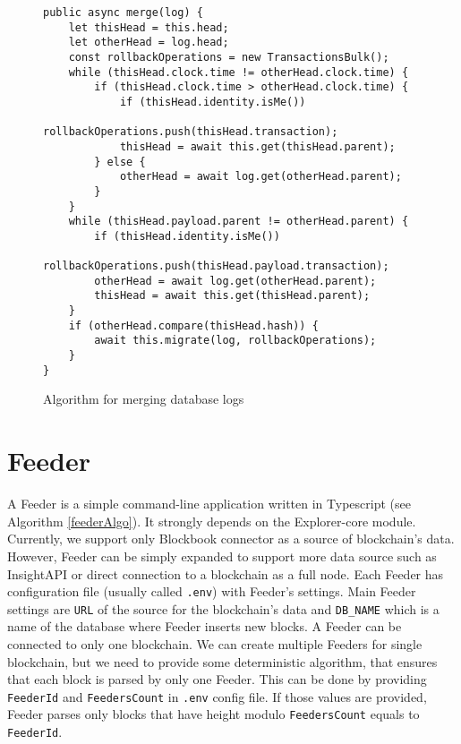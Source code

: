 \begin{figure}[h]
    \centering
    \begin{lstlisting}[style=ES6]
public async merge(log) {
    let thisHead = this.head;
    let otherHead = log.head;
    const rollbackOperations = new TransactionsBulk();
    while (thisHead.clock.time != otherHead.clock.time) {
        if (thisHead.clock.time > otherHead.clock.time) {
            if (thisHead.identity.isMe())
                rollbackOperations.push(thisHead.transaction);
            thisHead = await this.get(thisHead.parent);
        } else {
            otherHead = await log.get(otherHead.parent);
        }
    }
    while (thisHead.payload.parent != otherHead.parent) {
        if (thisHead.identity.isMe())
            rollbackOperations.push(thisHead.payload.transaction);
        otherHead = await log.get(otherHead.parent);
        thisHead = await this.get(thisHead.parent);
    }
    if (otherHead.compare(thisHead.hash)) {
        await this.migrate(log, rollbackOperations);
    }
}
    \end{lstlisting}
    \caption{Algorithm for merging database logs}
    \label{dblogMergeAlgo}
\end{figure}

\section{Feeder}
A Feeder is a simple command-line application written in Typescript (see Algorithm \ref{feederAlgo}). It strongly depends on the Explorer-core module. Currently, we support only Blockbook connector as a source of blockchain's data. However, Feeder can be simply expanded to support more data source such as InsightAPI or direct connection to a blockchain as a full node. Each Feeder has configuration file (usually called \texttt{.env}) with Feeder's settings. Main Feeder settings are \texttt{URL} of the source for the blockchain's data and \texttt{DB\_NAME} which is a name of the database where Feeder inserts new blocks. A Feeder can be connected to only one blockchain. We can create multiple Feeders for single blockchain, but we need to provide some deterministic algorithm, that ensures that each block is parsed by only one Feeder. This can be done by providing \texttt{FeederId} and \texttt{FeedersCount}  in \texttt{.env} config file. If those values are provided, Feeder parses only blocks that have height modulo \texttt{FeedersCount} equals to \texttt{FeederId}. 


